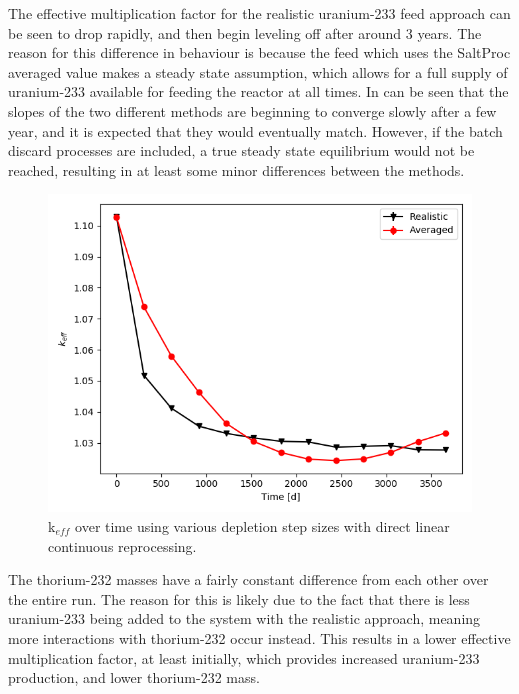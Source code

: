The effective multiplication factor for the realistic uranium-233 feed approach can be seen to drop rapidly, and then begin leveling off after around 3 years. The reason for this difference in behaviour is because the feed which uses the SaltProc averaged value makes a steady state assumption, which allows for a full supply of uranium-233 available for feeding the reactor at all times. In can be seen that the slopes of the two different methods are beginning to converge slowly after a few year, and it is expected that they would eventually match. However, if the batch discard processes are included, a true steady state equilibrium would not be reached, resulting in at least some minor differences between the methods.

\begin{figure}[H]
  \centering
  \includegraphics[scale=0.7]{images/adv-keff.png}
  \caption{k$_{eff}$ over time using various depletion step sizes with direct linear continuous reprocessing.}
   \label{fig:DL-cont-k-adv}
\end{figure}

The thorium-232 masses have a fairly constant difference from each other over the entire run. The reason for this is likely due to the fact that there is less uranium-233 being added to the system with the realistic approach, meaning more interactions with thorium-232 occur instead. This results in a lower effective multiplication factor, at least initially, which provides increased uranium-233 production, and lower thorium-232 mass.

